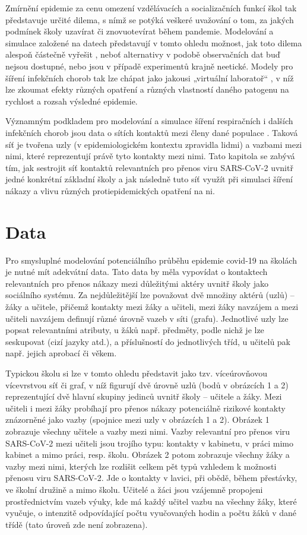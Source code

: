 Zmírnění epidemie za cenu omezení vzdělávacích a socializačních funkcí škol tak představuje určité dilema, s nímž se potýká veškeré uvažování o tom, za jakých podmínek školy uzavírat či znovuotevírat během pandemie. Modelování a simulace založené na datech představují v tomto ohledu možnost, jak toto dilema alespoň částečně vyřešit \cite{squazzoni2020computational}, neboť alternativy v podobě observačních dat buď nejsou dostupné, nebo jsou v případě experimentů krajně neetické. Modely pro šíření infekčních chorob tak lze chápat jako jakousi „virtuální laboratoř“ \cite{Rao_etal2021}, v níž lze zkoumat efekty různých opatření a různých vlastností daného patogenu na rychlost a rozsah výsledné epidemie.

Významným podkladem pro modelování a simulace šíření respiračních i dalších infekčních chorob jsou data o sítích kontaktů mezi členy dané populace \cite{danon2011networks, luke2007network, zaj:mossong2008social}. Taková síť je tvořena uzly (v epidemiologickém kontextu zpravidla lidmi) a vazbami mezi nimi, které reprezentují právě tyto kontakty mezi nimi. Tato kapitola se zabývá tím, jak sestrojit síť kontaktů relevantních pro přenos viru SARS-CoV-2 uvnitř jedné konkrétní základní školy a jak následně tuto síť využít při simulaci šíření nákazy a vlivu různých protiepidemických opatření na ni. 


\section*{Data} 
Pro smysluplné modelování potenciálního průběhu epidemie covid-19 na školách je nutné mít adekvátní data. Tato data by měla vypovídat o kontaktech relevantních pro přenos nákazy mezi důležitými aktéry uvnitř školy jako sociálního systému. Za nejdůležitější lze považovat dvě množiny aktérů (uzlů) – žáky a učitele, přičemž kontakty mezi žáky a učiteli, mezi žáky navzájem a mezi učiteli navzájem definují různé úrovně vazeb v síti (grafu). Jednotlivé uzly lze popsat relevantními atributy, u žáků např. předměty, podle nichž je lze seskupovat (cizí jazyky atd.), a příslušností do jednotlivých tříd, u učitelů pak např. jejich aprobací či věkem. 

Typickou školu si lze v tomto ohledu představit jako tzv. víceúrovňovou vícevrstvou síť či graf, v níž figurují dvě úrovně uzlů (bodů v obrázcích 1 a 2) reprezentující dvě hlavní skupiny jedinců uvnitř školy – učitele a žáky. Mezi učiteli i mezi žáky probíhají pro přenos nákazy potenciálně rizikové kontakty znázorněné jako vazby (spojnice mezi uzly v obrázcích 1 a 2). Obrázek 1 zobrazuje všechny učitele a vazby mezi nimi. Vazby relevantní pro přenos viru SARS-CoV-2 mezi učiteli jsou trojího typu: kontakty v kabinetu, v práci mimo kabinet a mimo práci, resp. školu. Obrázek 2 potom zobrazuje všechny žáky a vazby mezi nimi, kterých lze rozlišit celkem pět typů vzhledem k možnosti přenosu viru SARS-CoV-2. Jde o kontakty v lavici, při obědě, během přestávky, ve školní družině a mimo školu. Učitelé a žáci jsou vzájemně propojeni prostřednictvím vazeb výuky, kde má každý učitel vazbu na všechny žáky, které vyučuje, o intenzitě odpovídající počtu vyučovaných hodin a počtu žáků v dané třídě (tato úroveň zde není zobrazena).

